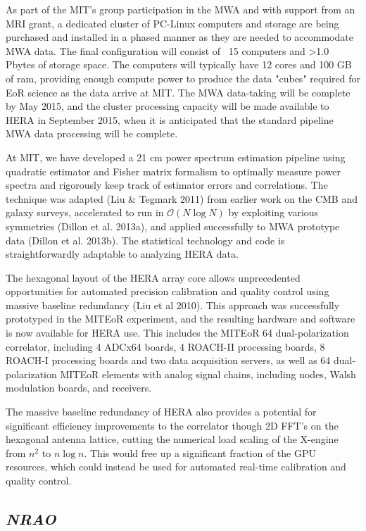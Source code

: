 \documentclass[11pt]{article}
\begin{document}
As part of the MIT's group participation in the MWA and with support from an MRI grant, a dedicated cluster of PC-Linux computers and storage are being purchased and installed in a phased manner as they are needed to accommodate MWA data. The final configuration will consist of ~15 computers and >1.0 Pbytes of storage space. The computers will typically have 12 cores and 100 GB of ram, providing enough compute power to produce the data "cubes" required for EoR science as the data arrive at MIT. The MWA data-taking will be complete by May 2015, and the cluster processing capacity will be made available to HERA in September 2015, when it is anticipated that the standard pipeline MWA data processing will be complete.

At MIT, we have developed a 21 cm power spectrum estimation pipeline using quadratic estimator and Fisher matrix formalism to optimally measure power spectra and rigorously keep track of estimator errors and correlations.  The technique was adapted (Liu \& Tegmark 2011) from earlier work on the CMB and galaxy surveys, accelerated to run in $\mathcal{O}(N\log N)$ by exploiting various symmetries (Dillon et al. 2013a), and applied successfully to MWA prototype data (Dillon et al. 2013b). The statistical technology and code is straightforwardly adaptable to analyzing HERA data.

The hexagonal layout of the HERA array core allows unprecedented opportunities for automated precision calibration and quality control using massive baseline redundancy (Liu et al 2010). This approach was successfully prototyped in the MITEoR experiment, and the resulting hardware and software is now available for HERA use. This includes the MITEoR 64 dual-polarization correlator, including 4 ADCx64 boards, 4 ROACH-II processing boards, 8 ROACH-I processing boards and two data acquisition servers, as well as 64 dual-polarization MITEoR elements with analog signal chains, including nodes, Walsh modulation boards, and receivers.

The massive baseline redundancy of HERA also provides a potential for significant efficiency improvements to the correlator though 2D FFT's on the hexagonal antenna lattice, cutting the numerical load scaling of the X-engine from $n^2$ to $n \log n$. This would free up a significant fraction of the GPU resources, which could instead be used for automated real-time calibration and quality control.


\subsection*{\it NRAO} 
\end{document}
